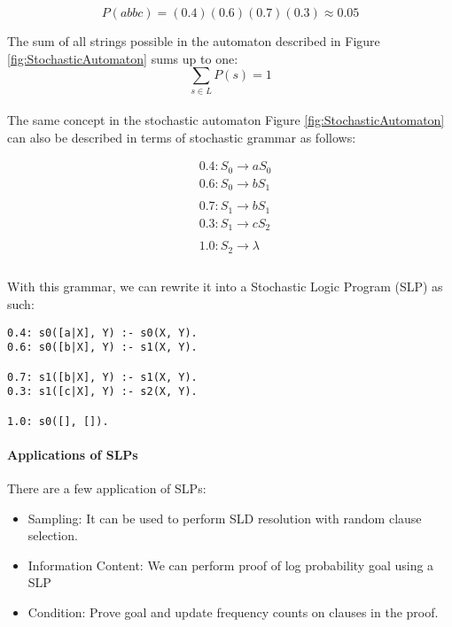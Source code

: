 \documentclass{article}
\theoremstyle{plain}
\theoremstyle{definition}
\begin{document}
\begin{multicols}{2}
$$P(abbc) = (0.4)(0.6)(0.7)(0.3) \approx 0.05$$

\noindent The sum of all strings possible in the automaton described in Figure \ref{fig:StochasticAutomaton} sums up to one: $$\sum_{s \in L} P(s) = 1$$

\paragraph{} The same concept in the stochastic automaton Figure \ref{fig:StochasticAutomaton} can also be described in terms of stochastic grammar as follows:

\begin{align*}
&0.4: S_0 \rightarrow aS_0\\
&0.6: S_0 \rightarrow bS_1\\
\\
&0.7: S_1 \rightarrow bS_1\\
&0.3: S_1 \rightarrow cS_2\\
\\
&1.0: S_2 \rightarrow \lambda\\
\end{align*}

\paragraph{} With this grammar, we can rewrite it into a Stochastic Logic Program (SLP) as such:

\begin{lstlisting}
0.4: s0([a|X], Y) :- s0(X, Y).
0.6: s0([b|X], Y) :- s1(X, Y).

0.7: s1([b|X], Y) :- s1(X, Y).
0.3: s1([c|X], Y) :- s2(X, Y).

1.0: s0([], []).
\end{lstlisting}

\paragraph{Applications of SLPs} There are a few application of SLPs:

\begin{itemize}
\item Sampling: It can be used to perform SLD resolution with random clause selection.
\item Information Content: We can perform proof of log probability goal using a SLP
\item Condition: Prove goal and update frequency counts on clauses in the proof.
\end{itemize}


\end{multicols}
\end{document}
